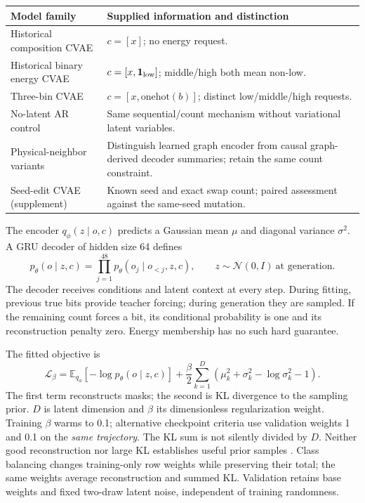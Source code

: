 \documentclass[10pt]{article}
\begin{document}
\begin{center}\small
\begin{tabular}{p{.28\linewidth}p{.62\linewidth}}
\toprule
Model family & Supplied information and distinction\\
\midrule
Historical composition CVAE & $c=[x]$; no energy request.\\
Historical binary energy CVAE & $c=[x,\mathbf1_{\rm low}]$; middle/high both mean non-low.\\
Three-bin CVAE & $c=[x,\mathrm{onehot}(b)]$; distinct low/middle/high requests.\\
No-latent AR control & Same sequential/count mechanism without variational latent variables.\\
Physical-neighbor variants & Distinguish learned graph encoder from causal graph-derived decoder summaries; retain the same count constraint.\\
Seed-edit CVAE (supplement) & Known seed and exact swap count; paired assessment against the same-seed mutation.\\
\bottomrule
\end{tabular}
\end{center}

The encoder $q_\phi(z\mid o,c)$ predicts a Gaussian mean $\mu$ and diagonal
variance $\sigma^2$. A GRU decoder of hidden size 64 defines
\begin{equation}
p_\theta(o\mid z,c)=\prod_{j=1}^{48}p_\theta(o_j\mid o_{<j},z,c),
\qquad z\sim\mathcal N(0,I)\ \text{at generation}.
\end{equation}
The decoder receives conditions and latent context at every step. During fitting,
previous true bits provide teacher forcing; during generation they are sampled.
If the remaining count forces a bit, its conditional probability is one and its
reconstruction penalty zero. Energy membership has no such hard guarantee.

The fitted objective is
\begin{equation}
\mathcal L_\beta=\mathbb E_{q_\phi}[-\log p_\theta(o\mid z,c)]
+\frac{\beta}{2}\sum_{k=1}^{D}
\left(\mu_k^2+\sigma_k^2-\log\sigma_k^2-1\right).
\end{equation}
The first term reconstructs masks; the second is KL divergence to the sampling
prior. $D$ is latent dimension and $\beta$ its dimensionless regularization
weight. Training $\beta$ warms to 0.1; alternative checkpoint criteria use
validation weights 1 and 0.1 on the \emph{same trajectory}. The KL sum is not
silently divided by $D$. Neither good reconstruction nor large KL establishes
useful prior samples \cite{kingma2014,sohn2015,alemi2018}.
Class balancing changes training-only row weights while preserving their total;
the same weights average reconstruction and summed KL. Validation retains base
weights and fixed two-draw latent noise, independent of training randomness.
\end{document}
